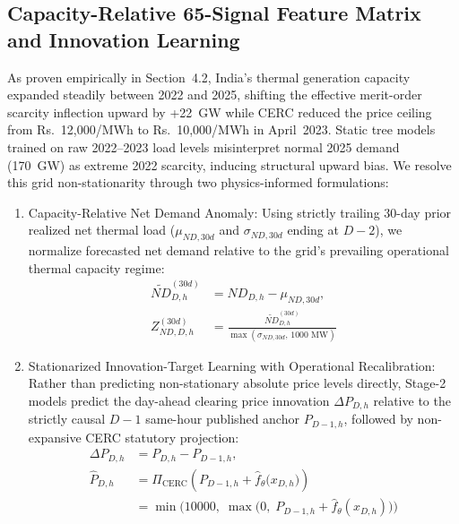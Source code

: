 \documentclass[journal,10pt,twocolumn]{IEEEtran}
\begin{document}
\subsection{Capacity-Relative 65-Signal Feature Matrix and Innovation Learning}
As proven empirically in Section~4.2, India's thermal generation capacity expanded steadily between 2022 and 2025, shifting the effective merit-order scarcity inflection upward by +22~GW while CERC reduced the price ceiling from Rs.~12,000/MWh to Rs.~10,000/MWh in April~2023. Static tree models trained on raw 2022--2023 load levels misinterpret normal 2025 demand (170~GW) as extreme 2022 scarcity, inducing structural upward bias. We resolve this grid non-stationarity through two physics-informed formulations:
\begin{enumerate}
    \item Capacity-Relative Net Demand Anomaly: Using strictly trailing 30-day prior realized net thermal load ($\mu_{ND, 30d}$ and $\sigma_{ND, 30d}$ ending at $D-2$), we normalize forecasted net demand relative to the grid's prevailing operational thermal capacity regime:
    \begin{equation}
    \begin{aligned}
    \widetilde{ND}_{D,h}^{(30d)} &= \widehat{ND}_{D,h} - \mu_{ND, 30d}, \\
    Z_{ND, D, h}^{(30d)} &= \frac{\widetilde{ND}_{D,h}^{(30d)}}{\max(\sigma_{ND, 30d}, \, 1000\text{ MW})}
    \end{aligned}
    \label{eq:cap_relative}
    \end{equation}
    \item Stationarized Innovation-Target Learning with Operational Recalibration: Rather than predicting non-stationary absolute price levels directly, Stage-2 models predict the day-ahead clearing price innovation $\Delta P_{D,h}$ relative to the strictly causal $D-1$ same-hour published anchor $P_{D-1, h}$, followed by non-expansive CERC statutory projection:
    \begin{equation}
    \begin{aligned}
    \Delta P_{D,h} &= P_{D,h} - P_{D-1, h}, \\
    \hat{P}_{D,h} &= \Pi_{\text{CERC}}\!\left(P_{D-1, h} + \hat{f}_{\theta}\big(x_{D,h}\big)\right) \\
    &= \min\!\Big(10000, \; \max\!\big(0, \; P_{D-1, h} + \hat{f}_{\theta}(x_{D,h})\big)\Big)
    \end{aligned}
    \label{eq:innovation_cerc}
    \end{equation}
\end{enumerate}
\end{document}
